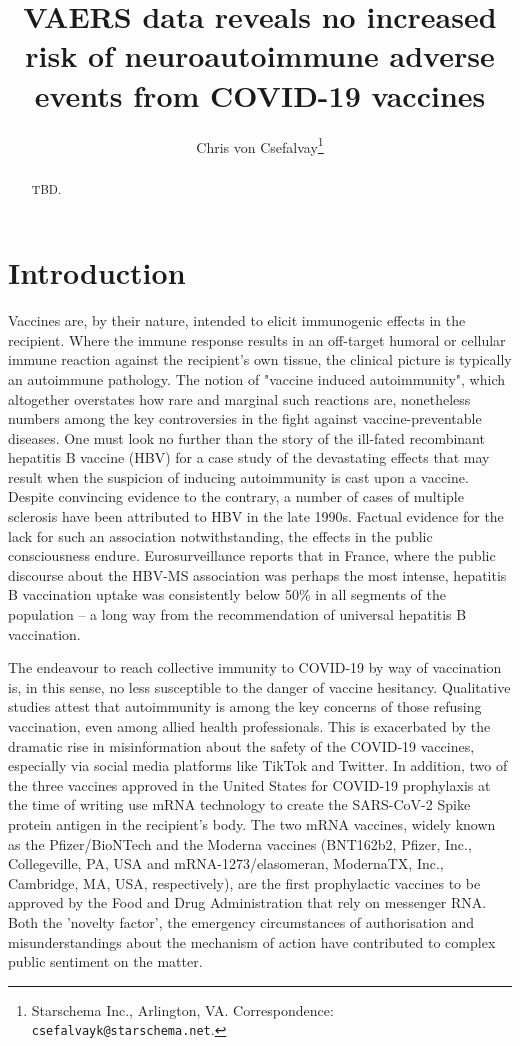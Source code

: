 \documentclass{article}
\title{VAERS data reveals no increased risk of neuroautoimmune adverse events from COVID-19 vaccines}
\author{Chris von Csefalvay\thanks{Starschema Inc., Arlington, VA. Correspondence: \texttt{csefalvayk@starschema.net}.}}
\begin{document}
\maketitle

\begin{abstract}
TBD.
\end{abstract}

\section{Introduction}

Vaccines are, by their nature, intended to elicit immunogenic effects in the recipient.
Where the immune response results in an off-target humoral or cellular immune reaction against the recipient's own tissue, the clinical picture is typically an autoimmune pathology.
The notion of "vaccine induced autoimmunity", which altogether overstates how rare and marginal such reactions are, nonetheless numbers among the key controversies in the fight against vaccine-preventable diseases.\cite{10.1093/cid/ciz135}
One must look no further than the story of the ill-fated recombinant hepatitis B vaccine (HBV) for a case study of the devastating effects that may result when the suspicion of inducing autoimmunity is cast upon a vaccine.
Despite convincing evidence to the contrary,\cite{doi:10.1056/NEJM200102013440502} a number of cases of multiple sclerosis have been attributed to HBV in the late 1990s.
Factual evidence for the lack for such an association notwithstanding,\cite{DeStefano_2002} the effects in the public consciousness endure.
Eurosurveillance reports that in France, where the public discourse about the HBV-MS association was perhaps the most intense, hepatitis B vaccination uptake was consistently below 50\% in all segments of the population\cite{Rey_2018} – a long way from the recommendation of universal hepatitis B vaccination.

The endeavour to reach collective immunity to COVID-19 by way of vaccination is, in this sense, no less susceptible to the danger of vaccine hesitancy.\cite{dror2020vaccine}
Qualitative studies attest that autoimmunity is among the key concerns of those refusing vaccination, even among allied health professionals.\cite{berry2021lessons}
This is exacerbated by the dramatic rise in misinformation about the safety of the COVID-19 vaccines,\cite{islam2021covid} especially via social media platforms like TikTok\cite{basch2021global} and Twitter.\cite{kearney2020twitter,krittanawong2020misinformation}
In addition, two of the three vaccines approved in the United States for COVID-19 prophylaxis at the time of writing use mRNA technology to create the SARS-CoV-2 Spike protein antigen in the recipient's body.
The two mRNA vaccines, widely known as the Pfizer/BioNTech and the Moderna vaccines (BNT162b2, Pfizer, Inc., Collegeville, PA, USA and mRNA-1273/elasomeran, ModernaTX, Inc., Cambridge, MA, USA, respectively), are the first prophylactic vaccines to be approved by the Food and Drug Administration that rely on messenger RNA.
Both the 'novelty factor', the emergency circumstances of authorisation and misunderstandings about the mechanism of action have contributed to complex public sentiment on the matter.
\end{document}
